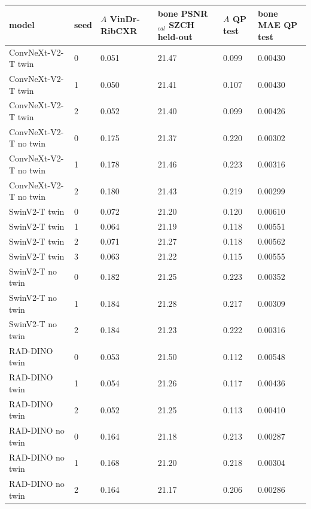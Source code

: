 \begin{tabular}{llllll}
\toprule
model & seed & $A$ VinDr-RibCXR & bone PSNR$_{cal}$ SZCH held-out & $A$ QP test & bone MAE QP test \\
\midrule
ConvNeXt-V2-T twin & 0 & 0.051 & 21.47 & 0.099 & 0.00430 \\
ConvNeXt-V2-T twin & 1 & 0.050 & 21.41 & 0.107 & 0.00430 \\
ConvNeXt-V2-T twin & 2 & 0.052 & 21.40 & 0.099 & 0.00426 \\
ConvNeXt-V2-T no twin & 0 & 0.175 & 21.37 & 0.220 & 0.00302 \\
ConvNeXt-V2-T no twin & 1 & 0.178 & 21.46 & 0.223 & 0.00316 \\
ConvNeXt-V2-T no twin & 2 & 0.180 & 21.43 & 0.219 & 0.00299 \\
SwinV2-T twin & 0 & 0.072 & 21.20 & 0.120 & 0.00610 \\
SwinV2-T twin & 1 & 0.064 & 21.19 & 0.118 & 0.00551 \\
SwinV2-T twin & 2 & 0.071 & 21.27 & 0.118 & 0.00562 \\
SwinV2-T twin & 3 & 0.063 & 21.22 & 0.115 & 0.00555 \\
SwinV2-T no twin & 0 & 0.182 & 21.25 & 0.223 & 0.00352 \\
SwinV2-T no twin & 1 & 0.184 & 21.28 & 0.217 & 0.00309 \\
SwinV2-T no twin & 2 & 0.184 & 21.23 & 0.222 & 0.00316 \\
RAD-DINO twin & 0 & 0.053 & 21.50 & 0.112 & 0.00548 \\
RAD-DINO twin & 1 & 0.054 & 21.26 & 0.117 & 0.00436 \\
RAD-DINO twin & 2 & 0.052 & 21.25 & 0.113 & 0.00410 \\
RAD-DINO no twin & 0 & 0.164 & 21.18 & 0.213 & 0.00287 \\
RAD-DINO no twin & 1 & 0.168 & 21.20 & 0.218 & 0.00304 \\
RAD-DINO no twin & 2 & 0.164 & 21.17 & 0.206 & 0.00286 \\
\bottomrule
\end{tabular}
